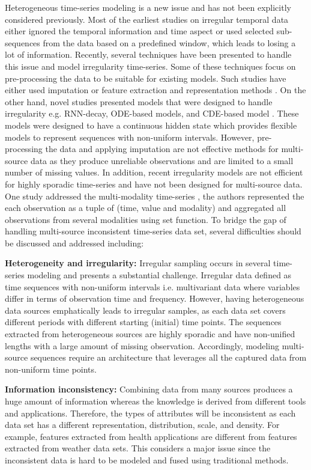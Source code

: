 \documentclass[conference]{IEEEtran}
\begin{document}
Heterogeneous time-series modeling is a new issue and has not been explicitly considered previously. Most of the earliest studies on irregular temporal data either ignored the temporal information and time aspect or used selected sub-sequences from the data based on a predefined window, which leads to losing a lot of information. Recently, several techniques have been presented to handle this issue and model irregularity time-series. Some of these techniques focus on pre-processing the data to be suitable for existing models. Such studies have either used imputation or feature extraction and representation methods \cite{pratap2019multi ,che2018recurrent,kim2018temporal,zhang2021feature}. On the other hand, novel studies presented models that were designed to handle irregularity e.g. RNN-decay, ODE-based models, and CDE-based model \cite{de2019gru,rubanova2019latent}. These models were designed to have a continuous hidden state which provides flexible models to represent sequences with non-uniform intervals. However, pre-processing the data and applying imputation are not effective methods for multi-source data as they produce unreliable observations and are limited to a small number of missing values.  In addition,  recent irregularity models are not efficient for highly sporadic time-series and have not been designed for multi-source data. One study addressed the multi-modality time-series \cite
{horn2020set}, the authors represented the each observation as a tuple of (time, value and modality) and aggregated all observations from several modalities using set function. To bridge the gap of handling multi-source inconsistent time-series data set, several difficulties should be discussed and addressed including:

\textbf{Heterogeneity and irregularity:} Irregular sampling occurs in several time-series modeling and presents a substantial challenge.  Irregular data defined as time sequences with non-uniform intervals i.e. multivariant data where variables differ in terms of observation time and frequency. However, having heterogeneous data sources emphatically leads to irregular samples, as each data set covers different periods with different starting (initial) time points. The sequences extracted from heterogeneous sources are highly sporadic and have non-unified lengths with a large amount of missing observation. Accordingly, modeling multi-source sequences require an architecture that leverages all the captured data from non-uniform time points.

\textbf{Information inconsistency:} Combining data from many sources produces a huge amount of information whereas the knowledge is derived from different tools and applications. Therefore, the types of attributes will be inconsistent as each data set has a different representation, distribution, scale, and density. For example, features extracted from health applications are different from features extracted from weather data sets. This considers a major issue since the inconsistent data is hard to be modeled and fused using traditional methods.
\end{document}

